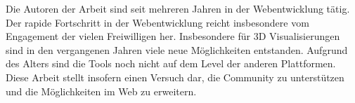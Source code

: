 Die Autoren der Arbeit sind seit mehreren Jahren in der Webentwicklung tätig. Der rapide Fortschritt in der Webentwicklung reicht insbesondere vom Engagement der vielen Freiwilligen her.
Insbesondere für 3D Visualisierungen sind in den vergangenen Jahren viele neue Möglichkeiten entstanden. Aufgrund des Alters sind die Tools noch nicht auf dem Level der anderen Plattformen. Diese Arbeit stellt insofern einen Versuch dar, die Community zu unterstützen und die Möglichkeiten im Web zu erweitern.
